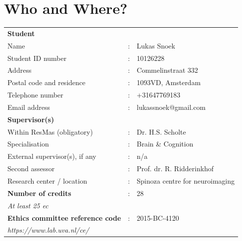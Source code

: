 \documentclass[12pt,a4paper]{article}\usepackage[]{graphicx}\usepackage[]{color}
\begin{document}
\newcommand\wordcount{
    \immediate\write18{texcount -sub=section \jobname.tex  | grep "Section" | 
    sed -e 's/+.*//' | sed -n \thesection p > 'count.txt'}
Word count: }

\onehalfspacing

\section{Who and Where?}
\vspace{\baselineskip}

\begin{tabular}{l l l}
\textbf{Student} \\
Name & : &                              Lukas Snoek\\
Student ID number & : &                 10126228 \\
Address & : &                           Commelinstraat 332 \\
Postal code and residence & : &         1093VD, Amsterdam \\
Telephone number & : &                  +31647769183 \\
Email address & : &                     lukassnoek@gmail.com \\[0.5cm]

\textbf{Supervisor(s)} \\
Within ResMas (obligatory) & : &            Dr. H.S. Scholte \\
Specialisation & : &                        Brain \& Cognition \\
External supervisor(s), if any & : &        n/a \\
Second assessor & : &                       Prof. dr. R. Ridderinkhof \\
Research center / location & : &            Spinoza centre for neuroimaging \\[0.5cm]

\textbf{Number of credits} & : &            28 \\
\textit{At least 25 ec} \\[0.5cm]

\textbf{Ethics committee reference code} & : & 2015-BC-4120 \\
\textit{https://www.lab.uva.nl/ce/} \\[0.5cm]

\end{tabular}
\end{document}
